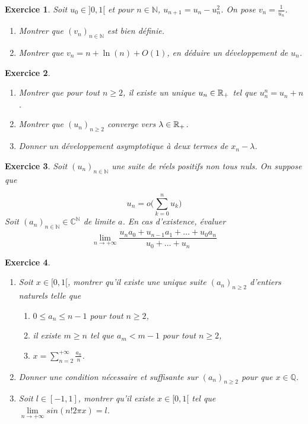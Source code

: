 \documentclass[12pt]{article}
\newtheorem{exercise}{Exercice}[section]
\theoremstyle{remark}
\theoremstyle{remark}
\newcommand{\C}{\mathbb{C}} \newcommand{\Q}{\mathbb{Q}}
\newcommand{\N}{\mathbb{N}} \newcommand{\Z}{\mathbb{Z}}
\begin{document}
\begin{exercise}
	Soit $u_{0}\in]0,1[$ et pour $n\in\N$, $u_{n+1}=u_{n}-u_{n}^{2}$. On pose
	$v_{n}=\frac{1}{u_{n}}$.
	\begin{enumerate}
		\item
		Montrer que $(v_{n})_{n\in\N}$ est bien définie.
		\item
		Montrer que $v_{n}=n+\ln(n)+O(1)$, en déduire un développement de $u_{n}$.
	\end{enumerate}
\end{exercise}

\begin{exercise}
	\phantom{}
	\begin{enumerate}
		\item
		Montrer que pour tout $n\geqslant 2$, il existe un unique $u_{n}\in\mathbb{R}_{+}$
		tel que $u_{n}^{n}=u_{n}+n$.
		\item
		Montrer que $(u_{n})_{n\geqslant 2}$ converge vers $\lambda\in\mathbb{R}_{+}$.
		\item
		Donner un développement asymptotique à deux termes de $x_{n}-\lambda$.
	\end{enumerate}
\end{exercise}

\begin{exercise}
	Soit $(u_{n})_{n\in\N}$ une suite de réels positifs non tous nuls. On suppose
	que
	
	$$u_n=o\Biggl(\sum_{k=0}^{n}u_{k}\Biggr)$$ Soit $(a_{n})_{n\in\N}\in\C^{\N}$
	de limite $a$. En cas d'existence, évaluer
	$$\lim\limits_{n\to+\infty}\frac{u_{n}a_{0}+u_{n-1}a_{1}+\dots+u_{0}a_{n}}{u_{0}+\dots+u_{n}}$$
\end{exercise}

\begin{exercise}
	\phantom{}
	\begin{enumerate}
		\item
		Soit $x\in[0,1[$, montrer qu'il existe une unique suite
		$(a_{n})_{n\geqslant 2}$ d'entiers naturels telle que 
		\begin{enumerate}
			\item
			[(i)] $0\leqslant a_{n}\leqslant n-1$ pour tout $n\geqslant2$,
			\item
			[(ii)] il existe $m\geqslant n$ tel que $a_{m}<m-1$ pour tout
			$n\geqslant2$,
			\item
			[(iii)] $x=\sum_{n=2}^{+\infty}\frac{a_{n}}{n}$.
		\end{enumerate}
		\item
		Donner une condition nécessaire et suffisante sur $(a_{n})_{n\geqslant2}$
		pour que $x\in\Q$.
		\item
		Soit $l\in[-1,1]$, montrer qu'il existe $x\in[0,1[$ tel que
		$\lim\limits_{n\to+\infty}sin(n!2\pi x)=l$.
	\end{enumerate}
\end{exercise}
\end{document}
